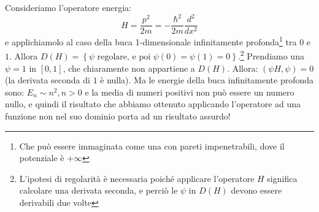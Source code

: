 \documentclass[FisicaTeorica.tex]{subfiles}
\begin{document}
	\begin{es}
	Consideriamo l'operatore energia: 
	\[H=\frac{p^2}{2m}=-\frac{\hbar^2}{2m}\frac{d^2}{dx^2}\]
	e applichiamolo al caso della buca 1-dimensionale infinitamente profonda\footnote{Che può essere immaginata come una  con pareti impenetrabili, dove il potenziale è $+\infty$} tra $0$ e $1$.
	Allora $D\left(H\right)=\left\{\psi\text{\ regolare,\ e\ poi\ } \psi\left(0\right)=\psi\left(1\right)=0\right\}$.\footnote{L'ipotesi di regolarità è necessaria poiché applicare l'operatore $H$ significa calcolare una derivata seconda, e perciò le $\psi$ in $D(H)$ devono essere derivabili due volte}
	Prendiamo una $\psi=1$ in $[0,1]$, che chiaramente non appartiene a $D(H)$. 
	Allora:
	$\left(\psi H,\psi\right)=0$ (la derivata seconda di $1$ è nulla).
	Ma le energie della buca infinitamente profonda sono: $E_n\sim n^2, n>0$ e la media di numeri positivi non può essere un numero nullo, e quindi il risultato che abbiamo ottenuto applicando l'operatore ad una funzione non nel suo dominio porta ad un risultato assurdo!
	\end{es}
\end{document}
